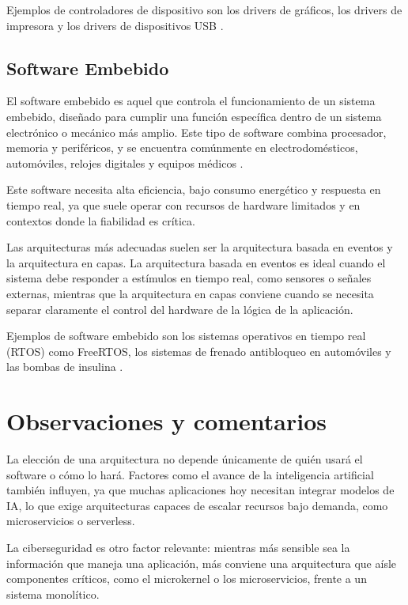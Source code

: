\documentclass[12pt, letterpaper]{article}
\begin{document}
Ejemplos de controladores de dispositivo son los drivers de gráficos, los drivers de impresora y los drivers de dispositivos USB \parencite{finoit2025software}.

\subsection{Software Embebido}
El software embebido es aquel que controla el funcionamiento de un sistema embebido, diseñado para cumplir una función específica dentro de un sistema electrónico o mecánico más amplio. Este tipo de software combina procesador, memoria y periféricos, y se encuentra comúnmente en electrodomésticos, automóviles, relojes digitales y equipos médicos \parencite{finoit2025software}.

Este software necesita alta eficiencia, bajo consumo energético y respuesta en tiempo real, ya que suele operar con recursos de hardware limitados y en contextos donde la fiabilidad es crítica.

Las arquitecturas más adecuadas suelen ser la arquitectura basada en eventos y la arquitectura en capas. La arquitectura basada en eventos es ideal cuando el sistema debe responder a estímulos en tiempo real, como sensores o señales externas, mientras que la arquitectura en capas conviene cuando se necesita separar claramente el control del hardware de la lógica de la aplicación.

Ejemplos de software embebido son los sistemas operativos en tiempo real (RTOS) como FreeRTOS, los sistemas de frenado antibloqueo en automóviles y las bombas de insulina \parencite{finoit2025software}.

\section*{Observaciones y comentarios}
La elección de una arquitectura no depende únicamente de quién usará el software o cómo lo hará. Factores como el avance de la inteligencia artificial también influyen, ya que muchas aplicaciones hoy necesitan integrar modelos de IA, lo que exige arquitecturas capaces de escalar recursos bajo demanda, como microservicios o serverless.

La ciberseguridad es otro factor relevante: mientras más sensible sea la información que maneja una aplicación, más conviene una arquitectura que aísle componentes críticos, como el microkernel o los microservicios, frente a un sistema monolítico.
\end{document}
